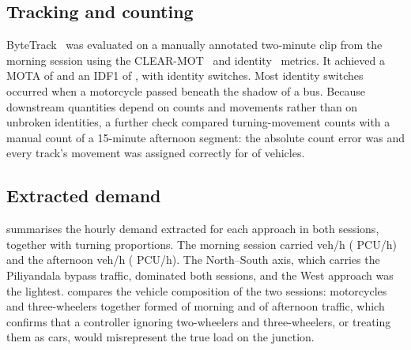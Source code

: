 \subsection{Tracking and counting}

ByteTrack~\cite{zhang2022bytetrack} was evaluated on a manually annotated two-minute clip from the morning session using the CLEAR-MOT~\cite{bernardin2008clearmot} and identity~\cite{ristani2016idf1} metrics. It achieved a MOTA of  and an IDF1 of , with  identity switches. Most identity switches occurred when a motorcycle passed beneath the shadow of a bus. Because downstream quantities depend on counts and movements rather than on unbroken identities, a further check compared \dtx{} turning-movement counts with a manual count of a 15-minute afternoon segment: the absolute count error was  and every track's movement was assigned correctly for  of vehicles.

\subsection{Extracted demand}

 summarises the hourly demand extracted for each approach in both sessions, together with turning proportions. The morning session carried  veh/h ( PCU/h) and the afternoon  veh/h ( PCU/h). The North--South axis, which carries the Piliyandala bypass traffic, dominated both sessions, and the West approach was the lightest.  compares the vehicle composition of the two sessions: motorcycles and three-wheelers together formed  of morning and  of afternoon traffic, which confirms that a controller ignoring two-wheelers and three-wheelers, or treating them as cars, would misrepresent the true load on the junction.

